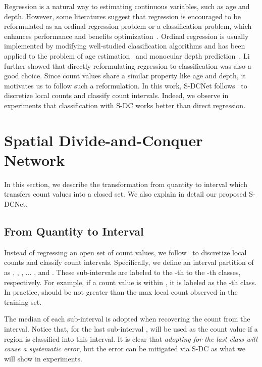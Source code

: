 \documentclass[10pt,twocolumn,letterpaper]{article}
\begin{document}
	Regression is a natural way to estimating continuous variables, such as age and depth. However, some literatures suggest that regression is encouraged to be reformulated as an ordinal regression problem or a classification problem, which enhances performance and benefits optimization~\cite{Cumulative_2013_CVPR,Ordinal_depth_2018_CVPR,li2018deep,Ordinal_age_2016_CVPR}. Ordinal regression is usually implemented by modifying well-studied classification algorithms and has been applied to the problem of age estimation~\cite{Ordinal_age_2016_CVPR} and monocular depth prediction~\cite{Ordinal_depth_2018_CVPR}. Li~\etal~\cite{li2018deep} further showed that directly reformulating regression to classification was also a good choice. Since count values share a similar property like age and depth, it motivates us to follow such a reformulation. In this work, S-DCNet follows~\cite{li2018deep} to discretize local counts and classify count intervals. Indeed, we observe in experiments that classification with S-DC works better than direct regression.
	
	\section{Spatial Divide-and-Conquer Network}
	
	In this section, we describe the transformation from quantity to interval which transfers count values into a closed set. We also explain in detail our proposed S-DCNet.


	\subsection{From Quantity to Interval }
Instead of regressing an open set of count values, we follow~\cite{li2018deep} to discretize local counts and classify count intervals. Specifically, we define an interval partition of  as , , , ... ,  and . These  sub-intervals are labeled to the -th to the -th classes, respectively. For example, if a count value is within , it is labeled as the -th class. In practice,  should be not greater than the max local count observed in the training set.


	The median of each sub-interval is adopted when recovering the count from the interval. Notice that, for the last sub-interval ,  will be used as the count value if a region is classified into this interval. It is clear that \emph{adopting  for the last class will cause a systematic error}, but the error can be mitigated via S-DC as what we will show in experiments.
	
\end{document}
